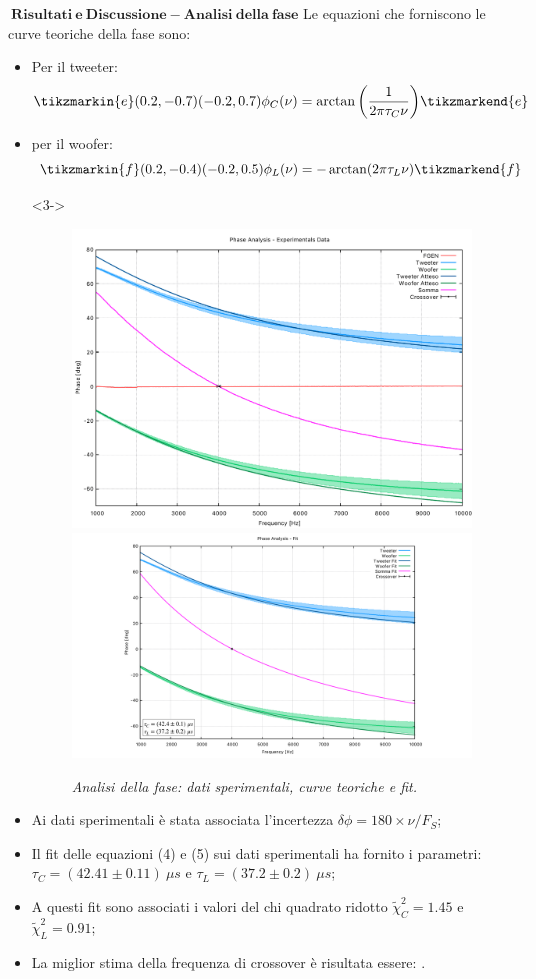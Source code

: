 \documentclass{beamer}
\begin{document}
\begin{frame}{$\mathbf{\ Risultati \ e \ Discussione - Analisi \ della \ fase}$}
    Le equazioni che forniscono le curve teoriche della fase sono:
    \begin{itemize}
        \item <1-> Per il tweeter:
    \begin{equation}
        \tikzmarkin{e}(0.2,-0.7)(-0.2,0.7)
            \phi_C(\nu)= \arctan\bigg( \frac{1}{2 \pi \tau_C \nu}\bigg)
        \tikzmarkend{e} 
    \end{equation}
    \item <2-> per il woofer:
    \begin{equation}
        \tikzmarkin{f}(0.2,-0.4)(-0.2,0.5)
            \phi_L(\nu)= -\arctan(2 \pi \tau_L \nu)
        \tikzmarkend{f} 
    \end{equation}
    \item [] <3-> \begin{figure}
        \includegraphics[width=0.45\linewidth]{../results/CFPhase.pdf}
        \includegraphics[width=0.45\linewidth]{../results/CFPhaseFit.pdf}
        \caption{\textit{Analisi della fase: dati sperimentali, curve teoriche e fit.}}
    \end{figure} 
    \end{itemize}
\end{frame}

\begin{frame}
    \begin{itemize}
        \item <1-> Ai dati sperimentali è stata associata l'incertezza 
        $\delta \phi = 180 \times \nu / F_S $;
        \item <2-> Il fit delle equazioni (4) e (5) sui dati sperimentali ha fornito i parametri: $\tau_C=(42.41 \pm 0.11) \ \mu s$ e $\tau_L=(37.2 \pm 0.2) \ \mu s$;
        \item <3-> A questi fit sono associati i valori del chi quadrato ridotto $\tilde{\chi}^2_C=1.45$ e $\tilde{\chi}^2_L=0.91$;
        \item <4-> La miglior stima della frequenza di crossover è risultata essere: \color{blue}{$\nu_0=(4007 \pm 16) \ Hz$}.
    \end{itemize}
\end{frame}
\end{document}
